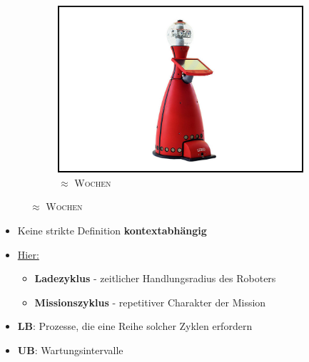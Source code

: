 \documentclass{beamer}
\begin{document}
\begin{frame}
\begin{figure}[H]
\begin{subfigure}[b]{0.32\textwidth}
      \includegraphics[width=\textwidth]{img/service_robot.jpg}
      \caption*{\textsc{$\approx$ Wochen \cite{ServiceRobot}}}
    \end{subfigure}
  \end{figure}
  \begin{itemize}
    \item Keine strikte Definition \textrightarrow \thinspace \textbf{kontextabhängig}
    \item \underline{Hier:}
    \begin{itemize}
      \item \textbf{Ladezyklus} - zeitlicher Handlungsradius des Roboters
      \item \textbf{Missionszyklus} - repetitiver Charakter der Mission
    \end{itemize}
    \item \textbf{LB}: Prozesse, die eine Reihe solcher Zyklen erfordern
    \item \textbf{UB}: Wartungsintervalle
  \end{itemize}
\end{frame}
\end{document}

